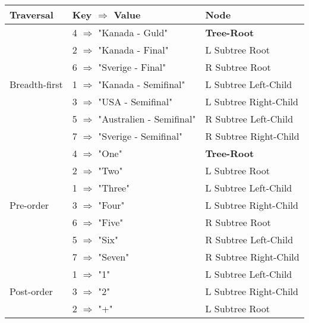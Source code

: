 \documentclass[a4paper, 11pt]{article}
\begin{document}
    \begin{tabular}{|l|l|l|}
        \hline
        Traversal                     & Key $\Rightarrow$ Value                 & Node\\
        \hline\hline
        \multirow{7}{*}{Breadth-first}& 4 $\Rightarrow$ "Kanada - Guld"         & \textbf{Tree-Root} \\
                                      & 2 $\Rightarrow$ "Kanada - Final"        & L Subtree Root\\
                                      & 6 $\Rightarrow$ "Sverige - Final"       & R Subtree Root\\
                                      & 1 $\Rightarrow$ "Kanada - Semifinal"    & L Subtree Left-Child\\
                                      & 3 $\Rightarrow$ "USA - Semifinal"       & L Subtree Right-Child\\
                                      & 5 $\Rightarrow$ "Australien - Semifinal" & R Subtree Left-Child\\
                                      & 7 $\Rightarrow$ "Sverige - Semifinal"    & R Subtree Right-Child\\
        \hline
        \multirow{7}{*}{Pre-order}    & 4 $\Rightarrow$ "One"       & \textbf{Tree-Root} \\ %
                                      & 2 $\Rightarrow$ "Two"       & L Subtree Root\\
                                      & 1 $\Rightarrow$ "Three"     & L Subtree Left-Child\\
                                      & 3 $\Rightarrow$ "Four"      & L Subtree Right-Child\\
                                      & 6 $\Rightarrow$ "Five"      & R Subtree Root\\\
                                      & 5 $\Rightarrow$ "Six"       & R Subtree Left-Child\\
                                      & 7 $\Rightarrow$ "Seven"     & R Subtree Right-Child\\
        \hline
        \multirow{7}{*}{Post-order}   & 1 $\Rightarrow$ "1"         & L Subtree Left-Child\\
                                      & 3 $\Rightarrow$ "2"         & L Subtree Right-Child\\
                                      & 2 $\Rightarrow$ "+"         & L Subtree Root\\

\end{tabular}
\end{document}
